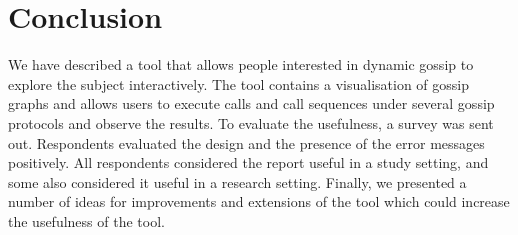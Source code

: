 
\section{Conclusion}

We have described a tool that allows people interested in dynamic gossip to explore the subject interactively.
The tool contains a visualisation of gossip graphs and allows users to execute calls and call sequences under several gossip protocols and observe the results. 
To evaluate the usefulness, a survey was sent out. 
Respondents evaluated the design and the presence of the error messages positively. 
All respondents considered the report useful in a study setting, and some also considered it useful in a research setting. 
Finally, we presented a number of ideas for improvements and extensions of the tool which could increase the usefulness of the tool.